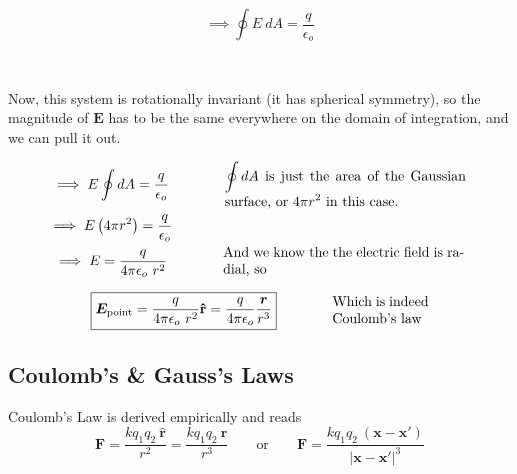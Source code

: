 \documentclass{article}
\numberwithin{equation}{section}
\newcommand{\rhat}{\mathbf{\hat{r}}}
\begin{document}
\vspace{1cm}

\begin{minipage}{0.36\textwidth}
\begin{flushleft}
\begin{equation*}
    \implies \oint E\ dA = \frac{q}{\epsilon_o}
\end{equation*}
\end{flushleft}
\end{minipage}
~
\begin{minipage}{0.64\textwidth}
\begin{flushright}
\parbox[c]{\textwidth}{Now, this system is rotationally invariant (it has spherical symmetry), so the magnitude of $\bm{E}$ has to be the same everywhere on the domain of integration, and we can pull it out.}
\end{flushright}
\end{minipage}

\begin{gather*}
    \implies E \oint dA = \frac{q}{\epsilon_o} \qquad\qquad \parbox[c]{0.5\textwidth}{$\displaystyle \oint dA$ is just the area of the Gaussian surface, or $\displaystyle 4\pi r^2$ in this case.} \\
    \implies E \left( 4\pi r^2 \right) = \frac{q}{\epsilon_o} \qquad\qquad \parbox[c]{0.5\textwidth}{\textcolor{white}{here}} \\
    \implies E = \frac{q}{4\pi \epsilon_o\ r^2} \qquad\qquad \parbox[c]{0.5\textwidth}{And we know the the electric field is radial, so}
\end{gather*}

\begin{equation*}
    \boxed{\bm{E}_{\text{point}} = \frac{q}{4\pi\epsilon_o\ r^2} \rhat = \frac{q}{4\pi\epsilon_o} \frac{\bm{r}}{r^3}} \qquad\qquad \parbox[c]{0.2\textwidth}{Which is indeed Coulomb's law}
\end{equation*}

\subsection*{Coulomb's \& Gauss's Laws}

Coulomb's Law is derived empirically and reads
\begin{equation*}
    \bm{F} = \frac{k q_1 q_2\ \rhat}{r^2} = \frac{k q_1 q_2\ \bm{r}}{r^3} \qquad \text{or} \qquad \bm{F} = \frac{k q_1 q_2\ \left( \bm{x} - \bm{x'} \right)}{\left| \bm{x} - \bm{x'} \right|^3}
\end{equation*}
\end{document}
